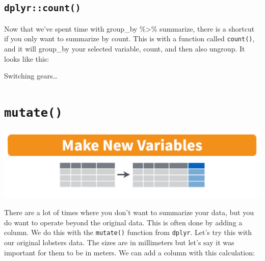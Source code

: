\documentclass[]{book}
\newenvironment{Shaded}{\begin{snugshade}}{\end{snugshade}}
\newcommand{\CommentTok}[1]{\textcolor[rgb]{0.56,0.35,0.01}{\textit{#1}}}
\newcommand{\DataTypeTok}[1]{\textcolor[rgb]{0.13,0.29,0.53}{#1}}
\newcommand{\KeywordTok}[1]{\textcolor[rgb]{0.13,0.29,0.53}{\textbf{#1}}}
\newcommand{\NormalTok}[1]{#1}
\newcommand{\OperatorTok}[1]{\textcolor[rgb]{0.81,0.36,0.00}{\textbf{#1}}}
\newcommand{\StringTok}[1]{\textcolor[rgb]{0.31,0.60,0.02}{#1}}
\begin{document}
\hypertarget{dplyrcount}{%
\subsection{\texorpdfstring{\texttt{dplyr::count()}}{dplyr::count()}}\label{dplyrcount}}

Now that we've spent time with group\_by \%\textgreater{}\% summarize, there is a shortcut if you only want to summarize by count. This is with a function called \texttt{count()}, and it will group\_by your selected variable, count, and then also ungroup. It looks like this:

\begin{Shaded}
\end{Shaded}

Switching gears\ldots{}

\hypertarget{mutate}{%
\section{\texorpdfstring{\texttt{mutate()}}{mutate()}}\label{mutate}}

\includegraphics[width=0.8\linewidth]{img/rstudio-cheatsheet-mutate}

There are a lot of times where you don't want to summarize your data, but you do want to operate beyond the original data. This is often done by adding a column. We do this with the \texttt{mutate()} function from \texttt{dplyr}. Let's try this with our original lobsters data. The sizes are in millimeters but let's say it was important for them to be in meters. We can add a column with this calculation:
\end{document}
